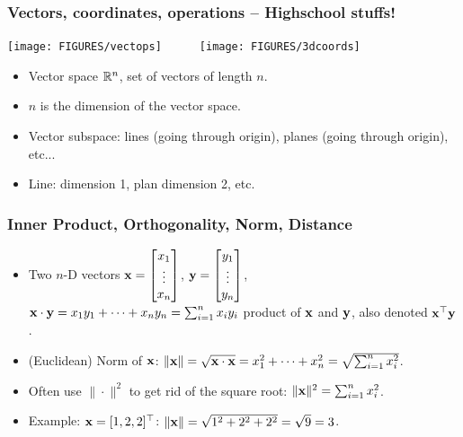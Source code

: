 \documentclass[8pt,dvipsnames]{beamer}
\newcommand{\myemph}[1]{{\color{blue}{#1}}}
\begin{document}
\begin{frame}
  \frametitle{Vectors, coordinates, operations -- Highschool stuffs!}
  \begin{center}
     \texttt{[image: FIGURES/vectops]}~~~~~~\texttt{[image: FIGURES/3dcoords]}
  \end{center}
  \begin{itemize}
  \item Vector space ${\mathbb R}^n$, set of vectors of length $n$. 
  \item $n$ is the dimension of the vector space.
  \item Vector subspace: lines (going through origin), planes (going through origin), etc...
  \item Line: dimension 1, plan dimension 2, etc.
  \end{itemize}
\end{frame}


\begin{frame}
  \frametitle{Inner Product, Orthogonality, Norm, Distance}
  \begin{itemize}[<+->]
  \item Two $n$-D vectors
    $ {\bf x} = \begin{bmatrix}
      x_1\\\vdots\\ x_n
    \end{bmatrix}
    $,
    $ {\bf y} = \begin{bmatrix}
      y_1\\\vdots\\ y_n
    \end{bmatrix}$,
    ${\bf x}\cdot{\bf y} = x_1y_1 + \dots + x_n y_n = \sum_{i=1}^nx_i y_i$
    \myemph{Inner/Dot/Scalar} product of ${\bf x}$ and ${\bf y}$, also denoted ${\bf x}^\top {\bf y}$.\vfill
  \item (Euclidean) Norm of ${\bf x}$: $\|{\bf x}\| = \sqrt{{\bf x}\cdot{\bf x}} = x_1^2+\dots+x_n^2=\sqrt{\sum_{i=1}^n x_i^2}$.
    \vfill
  \item Often use $\|\cdot\|^2$ to get rid of the square root: $\|{\bf x}\|^2 = \sum_{i=1}^n x_i^2$.
    \vfill
  \item Example: ${\bf x} = [1, 2, 2]^\top$: $\|{\bf x}\| = \sqrt{1^2 + 2^2 + 2^2} = \sqrt{9} = 3$.
  \end{itemize}
\end{frame}
\end{document}
